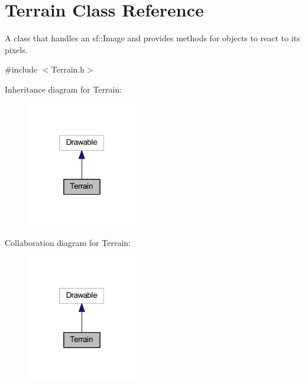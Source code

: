 \hypertarget{class_terrain}{}\section{Terrain Class Reference}
\label{class_terrain}


A class that handles an sf\+::\+Image and provides methods for objects to react to its pixels.  




{\ttfamily \#include $<$Terrain.\+h$>$}



Inheritance diagram for Terrain\+:\nopagebreak
\begin{figure}[H]
\begin{center}
\leavevmode
\includegraphics[width=136pt]{class_terrain__inherit__graph}
\end{center}
\end{figure}


Collaboration diagram for Terrain\+:\nopagebreak
\begin{figure}[H]
\begin{center}
\leavevmode
\includegraphics[width=136pt]{class_terrain__coll__graph}
\end{center}
\end{figure}

